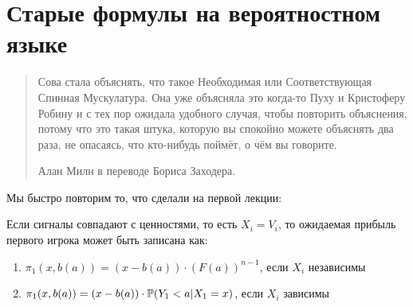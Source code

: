 \section{Старые формулы на вероятностном языке}


\begin{quotation}
Сова стала объяснять, что такое Необходимая или Соответствующая Спинная Мускулатура. Она уже объясняла это когда-то Пуху и Кристоферу Робину и с тех пор ожидала удобного случая, чтобы повторить объяснения, потому что это такая штука, которую вы спокойно можете объяснять два раза, не опасаясь, что кто-нибудь поймёт, о чём вы говорите.

Алан Милн в переводе Бориса Заходера.
\end{quotation}

Мы быстро повторим то, что сделали на первой лекции:
\begin{myth}
Если сигналы совпадают с ценностями, то есть $ X_{i}=V_{i} $, то ожидаемая прибыль первого игрока может быть записана как:
\begin{enumerate}
\item $\pi_{1}(x,b(a))=(x-b(a))\cdot (F(a))^{n-1}$, если $ X_{i} $ независимы
\item $\pi_{1}(x,b(a))=(x-b(a))\cdot \P(Y_{1}<a|X_{1}=x)$, если $ X_{i} $ зависимы
\end{enumerate}
\end{myth}


